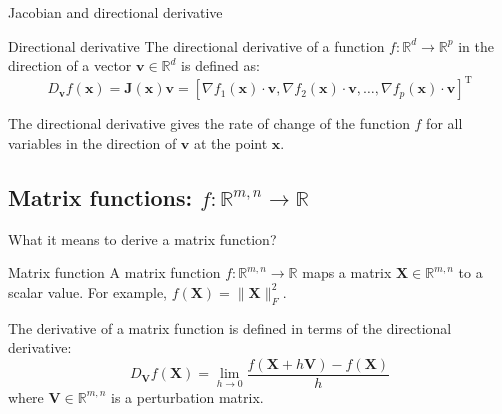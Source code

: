 \documentclass[aspectratio=1610]{beamer}
\begin{document}
\begin{frame}{Jacobian and directional derivative}

  \begin{block}{Directional derivative}
    The directional derivative of a function $f:\mathbb{R}^d \to \mathbb{R}^p$ in the direction of a vector $\mathbf{v} \in \mathbb{R}^d$ is defined as:
    $$D_{\mathbf{v}}f(\mathbf{x}) = \mathbf{J}(\mathbf{x})\mathbf{v} = [\nabla f_1(\mathbf{x}) \cdot \mathbf{v}, \nabla f_2(\mathbf{x}) \cdot \mathbf{v}, \ldots, \nabla f_p(\mathbf{x}) \cdot \mathbf{v}]^\mathrm{T}$$
  \end{block}

  The directional derivative gives the rate of change of the function $f$ for all variables in the direction of $\mathbf{v}$ at the point $\mathbf{x}$.

\end{frame}

\subsection{Matrix functions: $f:\mathbb{R}^{m,n} \to \mathbb{R}$}

\begin{frame}{What it means to derive a matrix function?}

  \begin{block}{Matrix function}
    A matrix function $f:\mathbb{R}^{m,n} \to \mathbb{R}$ maps a matrix $\mathbf{X} \in \mathbb{R}^{m,n}$ to a scalar value. For example, $f(\mathbf{X}) = \|\mathbf{X}\|_F^2$.
  \end{block}

  The derivative of a matrix function is defined in terms of the directional derivative:
  $$D_{\mathbf{V}}f(\mathbf{X}) = \lim_{h \to 0} \frac{f(\mathbf{X} + h\mathbf{V}) - f(\mathbf{X})}{h}$$
  where $\mathbf{V} \in \mathbb{R}^{m,n}$ is a perturbation matrix.
\end{frame}
\end{document}

